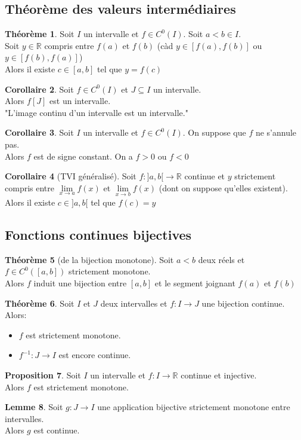 \documentclass[10pt,a4paper]{article}
\theoremstyle{definition}
\newtheorem{proposition}{Proposition}[section]
\newtheorem{theorem}[proposition]{Théorème}
\newtheorem{corollaire}[proposition]{Corollaire}
\newtheorem{lemme}[proposition]{Lemme}
\begin{document}
\subsection{Théorème des valeurs intermédiaires}
\begin{theorem}
Soit $I$ un intervalle et $f \in C^0(I)$. Soit $a < b \in I$. \\
Soit $y \in \mathbb{R}$ compris entre $f(a)$ et $f(b)$ (càd $y \in \left[f(a), f(b)\right]$ ou $y \in \left[f(b), f(a)\right]$) \\
Alors il existe $c \in [a, b]$ tel que $y = f(c)$
\end{theorem}
\begin{corollaire}
Soit $f \in C^0(I)$ et $J \subseteq I$ un intervalle. \\
Alors $f[J]$ est un intervalle. \\
"L'image continu d'un intervalle est un intervalle."
\end{corollaire}
\begin{corollaire}
Soit $I$ un intervalle et $f \in C^0(I)$. On suppose que $f$ ne s'annule pas. \\
Alors $f$ est de signe constant. On a $f > 0$ ou $f < 0$
\end{corollaire}
\begin{corollaire}[TVI généralisé]
Soit $f:]a, b[ \to \mathbb{R}$ continue et $y$ strictement compris entre $\lim\limits_{x \to a} f(x)$ et $\lim\limits_{x \to b} f(x)$ (dont on suppose qu'elles existent). \\
Alors il existe $c \in ]a, b[$ tel que $f(c) = y$
\end{corollaire}

\subsection{Fonctions continues bijectives}
\begin{theorem}[de la bijection monotone]
Soit $a < b$ deux réels et $f \in C^0([a ,b])$ strictement monotone. \\
Alors $f$ induit une bijection entre $[a, b]$ et le segment joignant $f(a)$ et $f(b)$
\end{theorem}
\begin{theorem}
Soit $I$ et $J$ deux intervalles et $f: I \to J$ une bijection continue.
Alors:
\begin{itemize}
\item $f$ est strictement monotone.
\item $f^{-1}:J \to I$ est encore continue.
\end{itemize}
\end{theorem}
\begin{proposition}
Soit $I$ un intervalle et $f: I \to \mathbb{R}$ continue et injective. \\
Alors $f$ est strictement monotone.
\end{proposition}
\begin{lemme}
Soit $g: J \to I$ une application bijective strictement monotone entre intervalles. \\
Alors $g$ est continue.
\end{lemme}
\end{document}
